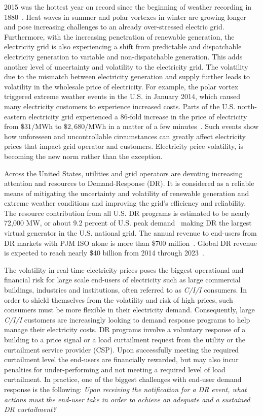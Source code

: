 2015 was the hottest year on record since the beginning of weather recording in 1880~\cite{noaa}. Heat waves in summer and polar vortexes in winter are growing longer and pose increasing challenges to an already over-stressed electric grid. Furthermore, with the increasing penetration of renewable generation, the electricity grid is also experiencing a shift from predictable and dispatchable electricity generation to variable and non-dispatchable generation. This adds another level of uncertainty and volatility to the electricity grid. The volatility due to the mismatch between electricity generation and supply further leads to volatility in the wholesale price of electricity. For example, the polar vortex triggered extreme weather events in the U.S. in January 2014, which caused many electricity customers to experience increased costs. Parts of the U.S. north-eastern electricity grid experienced a 86-fold increase in the price of electricity from $\$31/\si{\mega\watt\hour}$ to $\$2,680/\si{\mega\watt\hour}$ in a matter of a few minutes~\cite{volatility}.  Such events show how unforeseen and uncontrollable circumstances can greatly affect electricity prices that impact grid operator and customers. Electricity price volatility, is becoming the new norm rather than the exception.

Across the United States, utilities and grid operators are devoting increasing attention and resources to Demand-Response (DR). It is considered as a reliable means of mitigating the uncertainty and volatility of renewable generation and extreme weather conditions and improving the grid's efficiency and reliability. The resource contribution from all U.S. DR programs is estimated to be nearly 72,000 MW, or about 9.2 percent of U.S. peak demand~\cite{federal2008assessment} making DR the largest virtual generator in the U.S. national grid. The annual revenue to end-users from DR markets with PJM ISO alone is more than \$700 million~\cite{pjm}. Global DR revenue is expected to reach nearly \$40 billion from 2014 through 2023~\cite{navigant}.

The volatility in real-time electricity prices poses the biggest operational and financial risk for large scale end-users of electricity such as large commercial buildings, industries and institutions, often referred to as \textit{C/I/I} consumers. In order to shield themselves from the volatility and risk of high prices, such consumers must be more flexible in their electricity demand. Consequently, large \textit{C/I/I} customers are increasingly looking to demand response programs to help manage their electricity costs. DR programs involve a voluntary response of a building to a price signal or a load curtailment request from the utility or the curtailment service provider (CSP). Upon successfully meeting the required curtailment level the end-users are financially rewarded, but may also incur penalties for under-performing and not meeting a required level of load curtailment. In practice, one of the biggest challenges with end-user demand response is the following: \emph{Upon receiving the notification for a DR event, what actions must the end-user take in order to achieve an adequate and a sustained DR curtailment?} 

